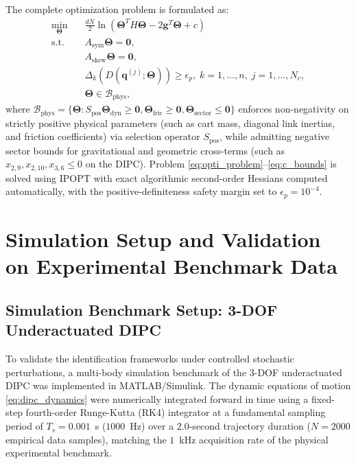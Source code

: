 \documentclass[lettersize,journal]{IEEEtran}
\begin{document}
The complete optimization problem is formulated as:
\begin{align}
    \min_{\bm{\Theta}} \quad & \frac{d N}{2} \ln \left( \bm{\Theta}^T H \bm{\Theta} - 2 \bm{g}^T \bm{\Theta} + c \right) \label{eq:opti_problem} \\
    \text{s.t.} \quad & A_{\mathrm{sym}} \bm{\Theta} = \mathbf{0}, \label{eq:c_sym} \\
    & A_{\mathrm{skew}} \bm{\Theta} = \mathbf{0}, \label{eq:c_skew} \\
    & \Delta_k(D(\bm{q}^{(j)}; \bm{\Theta})) \ge \epsilon_{p}, \; k = 1, \dots, n, \; j = 1, \dots, N_c, \label{eq:c_pd} \\
    & \bm{\Theta} \in \mathcal{B}_{\mathrm{phys}}, \label{eq:c_bounds}
\end{align}
where $\mathcal{B}_{\mathrm{phys}} = \{ \bm{\Theta} : S_{\text{pos}}\bm{\Theta}_{\text{dyn}} \ge \mathbf{0}, \bm{\Theta}_{\text{fric}} \ge \mathbf{0}, \bm{\Theta}_{\text{sector}} \le \mathbf{0} \}$ enforces non-negativity on strictly positive physical parameters (such as cart mass, diagonal link inertias, and friction coefficients) via selection operator $S_{\text{pos}}$, while admitting negative sector bounds for gravitational and geometric cross-terms (such as $x_{2,9}, x_{2,10}, x_{3,6} \le 0$ on the DIPC). Problem \eqref{eq:opti_problem}--\eqref{eq:c_bounds} is solved using IPOPT \cite{Wachter2006} with exact algorithmic second-order Hessians computed automatically, with the positive-definiteness safety margin set to $\epsilon_{p} = 10^{-4}$.

\section{Simulation Setup and Validation on Experimental Benchmark Data}
\label{sec:benchmarks_setup}

\subsection{Simulation Benchmark Setup: 3-DOF Underactuated DIPC}
\label{sec:dipc_sim_setup}
To validate the identification frameworks under controlled stochastic perturbations, a multi-body simulation benchmark of the 3-DOF underactuated DIPC was implemented in MATLAB/Simulink. The dynamic equations of motion \eqref{eq:dipc_dynamics} were numerically integrated forward in time using a fixed-step fourth-order Runge-Kutta (RK4) integrator at a fundamental sampling period of $T_s = 0.001$~s ($1000$~Hz) over a $2.0$-second trajectory duration ($N = 2000$ empirical data samples), matching the $1$~kHz acquisition rate of the physical experimental benchmark.
\end{document}
